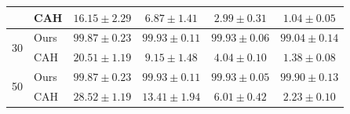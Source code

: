 \begin{table}[t]
\begin{tabular}{@{}clcccc@{}}
        & CAH  & $16.15 \pm 2.29$ & $6.87 \pm 1.41$ & $2.99 \pm 0.31$ & $1.04 \pm 0.05$ \\
        \midrule
        \multirow{2}{*}{30}
        & Ours & $\mathbf{99.87} \pm 0.23$ & $\mathbf{99.93} \pm 0.11$ & $\mathbf{99.93} \pm 0.06$ & $\mathbf{99.04} \pm 0.14$ \\
        & CAH  & $20.51 \pm 1.19$ & $9.15 \pm 1.48$ & $4.04 \pm 0.10$ & $1.38 \pm 0.08$ \\
        \midrule
        \multirow{2}{*}{50}
        & Ours & $\mathbf{99.87} \pm 0.23$ & $\mathbf{99.93} \pm 0.11$ & $\mathbf{99.93} \pm 0.05$ & $\mathbf{99.90} \pm 0.13$ \\
        & CAH  & $28.52 \pm 1.19$ & $13.41 \pm 1.94$ & $6.01 \pm 0.42$ & $2.23 \pm 0.10$ \\
        \bottomrule
    \end{tabular}
\end{table}

